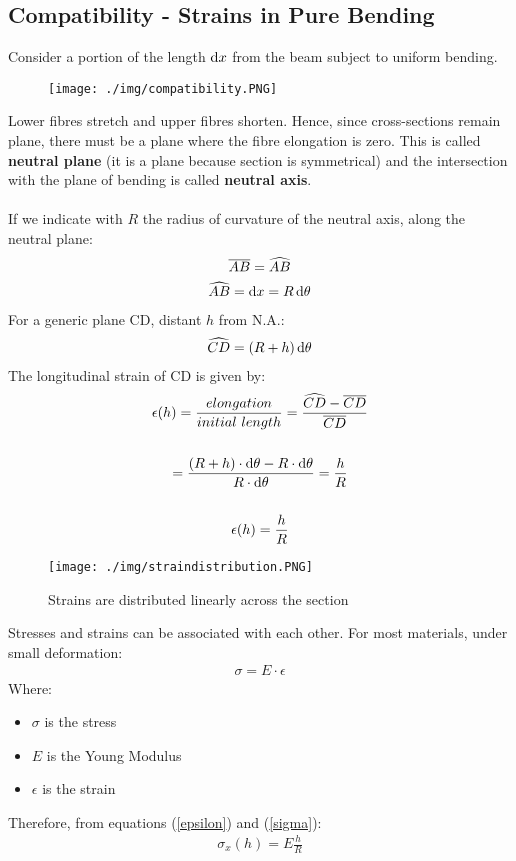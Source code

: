 \subsection{Compatibility - Strains in Pure Bending}
Consider a portion of the length $\dif x$ from the beam subject to uniform bending.
\begin{figure}[H]
  \centering
  \texttt{[image: ./img/compatibility.PNG]}
\end{figure}
Lower fibres stretch and upper fibres shorten. Hence, since cross-sections remain plane, there must be a plane where the fibre elongation is zero. This is called \textbf{neutral plane} (it is a plane because section is symmetrical) and the intersection with the plane of bending is called \textbf{neutral axis}. \\\\
If we indicate with $R$ the radius of curvature of the neutral axis, along the neutral plane:
\begin{gather}
  \overline{AB} = \widehat{AB} \\
  \widehat{AB} = \dif x = R\dif \theta
\end{gather}
For a generic plane CD, distant $h$ from N.A.:
\begin{gather}
  \widehat{CD} = (R+h)\dif \theta
\end{gather}
The longitudinal strain of CD is given by:
\begin{gather}
  \epsilon(h) = \frac{elongation}{initial\ length} = \frac{\widehat{CD}-\overline{CD}}{\overline{CD}} \\\\
  = \frac{(R+h)\cdot \dif \theta - R\cdot \dif \theta}{R\cdot \dif \theta} = \frac{h}{R} \\\\
  \epsilon(h) = \frac{h}{R}
  \label{epsilon}
\end{gather}
\begin{figure}[H]
  \centering
  \texttt{[image: ./img/straindistribution.PNG]}
  \caption{Strains are distributed linearly across the section}
\end{figure}
Stresses and strains can be associated with each other. For most materials, under small deformation:
\begin{gather}
  \sigma = E\cdot \epsilon
  \label{sigma}
\end{gather}
Where:
\begin{itemize}[noitemsep]
  \item $\sigma$ is the stress
  \item $E$ is the Young Modulus
  \item $\epsilon$ is the strain
\end{itemize}
Therefore, from equations (\ref{epsilon}) and (\ref{sigma}):
\begin{gather}
  \sigma_x(h) = E\frac{h}{R}
\end{gather}
